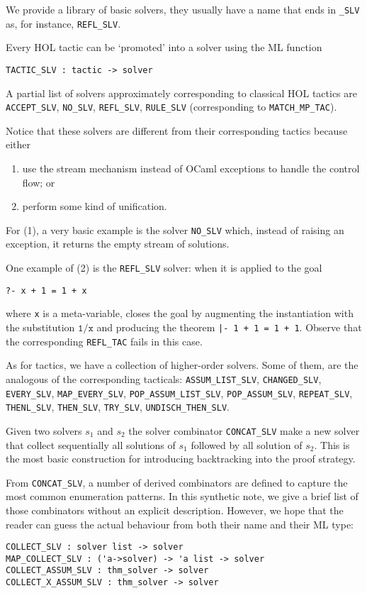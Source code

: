 We provide a library of basic solvers, they usually have a name that ends in
\verb|_SLV| as, for instance, \verb|REFL_SLV|.

Every HOL tactic can be `promoted' into a solver using the ML function
\begin{verbatim}
TACTIC_SLV : tactic -> solver
\end{verbatim}
A partial list of solvers approximately corresponding to classical HOL
tactics are \verb|ACCEPT_SLV|, \verb|NO_SLV|, \verb|REFL_SLV|,
\verb|RULE_SLV| (corresponding to \verb|MATCH_MP_TAC|).

Notice that these solvers are different from their corresponding
tactics because either
\begin{enumerate}
\item use the stream mechanism instead of OCaml exceptions to
  handle the control flow; or
\item perform some kind of unification.
\end{enumerate}

For (1), a very basic example is the solver \verb|NO_SLV| which,
instead of raising an exception, it returns the empty stream of
solutions.

One example of (2) is the \verb|REFL_SLV| solver: when it is applied
to the goal
\begin{verbatim}
?- x + 1 = 1 + x
\end{verbatim}
where \verb|x| is a meta-variable, closes the goal by augmenting the
instantiation with the substitution $\mathtt{1}/\mathtt{x}$ and
producing the theorem \verb!|- 1 + 1 = 1 + 1!.  Observe that the
corresponding \verb|REFL_TAC| fails in this case.

As for tactics, we have a collection of higher-order solvers.  Some of
them, are the analogous of the corresponding tacticals:
\verb|ASSUM_LIST_SLV|,
\verb|CHANGED_SLV|,
\verb|EVERY_SLV|,
\verb|MAP_EVERY_SLV|,
\verb|POP_ASSUM_LIST_SLV|,
\verb|POP_ASSUM_SLV|,
\verb|REPEAT_SLV|,
\verb|THENL_SLV|,
\verb|THEN_SLV|,
\verb|TRY_SLV|,
\verb|UNDISCH_THEN_SLV|.


Given two solvers $s_1$ and $s_2$ the solver combinator
\verb|CONCAT_SLV| make a new solver that collect sequentially all
solutions of $s_1$ followed by all solution of $s_2$.  This is the
most basic construction for introducing backtracking into the proof
strategy.

From \verb|CONCAT_SLV|, a number of derived combinators are defined to
capture the most common enumeration patterns.  In this synthetic note,
we give a brief list of those combinators without an explicit
description. However, we hope that the reader can guess the actual
behaviour from both their name and their ML type:
\begin{verbatim}
COLLECT_SLV : solver list -> solver
MAP_COLLECT_SLV : ('a->solver) -> 'a list -> solver
COLLECT_ASSUM_SLV : thm_solver -> solver
COLLECT_X_ASSUM_SLV : thm_solver -> solver
\end{verbatim}

